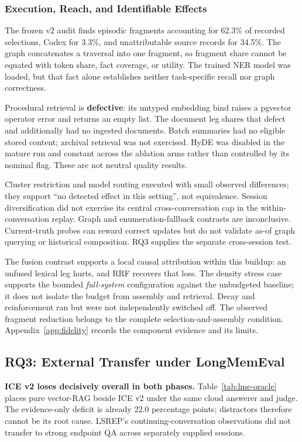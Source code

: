 \documentclass[11pt,a4paper]{article}
\begin{document}
\subsubsection{Execution, Reach, and Identifiable Effects}
\label{sec:carried}\label{sec:exercised}
The frozen v2 audit finds episodic fragments accounting for 62.3\% of recorded selections, Codex for 3.3\%, and unattributable source records for 34.5\%. The graph concatenates a traversal into one fragment, so fragment share cannot be equated with token share, fact coverage, or utility. The trained NER model was loaded, but that fact alone establishes neither task-specific recall nor graph correctness.

Procedural retrieval is \textbf{defective}: its untyped embedding bind raises a pgvector operator error and returns an empty list. The document leg shares that defect and additionally had no ingested documents. Batch summaries had no eligible stored content; archival retrieval was not exercised. HyDE was disabled in the mature run and constant across the ablation arms rather than controlled by its nominal flag. These are not neutral quality results.

Cluster restriction and model routing executed with small observed differences; they support ``no detected effect in this setting'', not equivalence. Session diversification did not exercise its central cross-conversation cap in the within-conversation replay. Graph and enumeration-fallback contrasts are inconclusive. Current-truth probes can reward correct updates but do not validate as-of graph querying or historical composition. RQ3 supplies the separate cross-session test.

The fusion contrast supports a local causal attribution within this buildup: an unfused lexical leg hurts, and RRF recovers that loss. The density stress case supports the bounded \emph{full-system} configuration against the unbudgeted baseline; it does not isolate the budget from assembly and retrieval. Decay and reinforcement ran but were not independently switched off. The observed fragment reduction belongs to the complete selection-and-assembly condition. Appendix~\ref{app:fidelity} records the component evidence and its limits.

\subsection{RQ3: External Transfer under LongMemEval}
\label{sec:lme-oracle}
\textbf{ICE v2 loses decisively overall in both phases.} Table~\ref{tab:lme-oracle} places pure vector-RAG beside ICE v2 under the same cloud answerer and judge. The evidence-only deficit is already 22.0 percentage points; distractors therefore cannot be its root cause. LSREP's continuing-conversation observations did not transfer to strong endpoint QA across separately supplied sessions.
\end{document}
